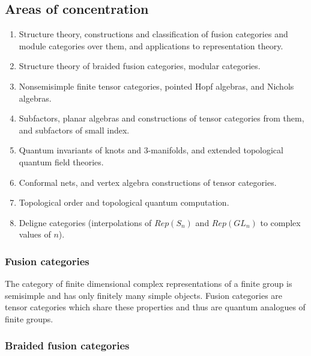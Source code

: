 \documentclass[11pt]{article}
\begin{document}



\subsection{Areas of concentration}
\begin{enumerate}
\item Structure theory, constructions and classification of fusion categories and module categories over them, and applications to representation theory.
\item Structure theory of braided fusion categories, modular categories.
\item Nonsemisimple finite tensor categories, pointed Hopf algebras, and Nichols algebras.
\item Subfactors, planar algebras and constructions of tensor categories from them, and subfactors of small index.
\item Quantum invariants of knots and 3-manifolds, and extended topological quantum field theories.
\item Conformal nets, and vertex algebra constructions of tensor categories.
\item Topological order and topological quantum computation.
\item Deligne categories (interpolations of $Rep(S_n)$ and $Rep(GL_n)$ to complex values of $n$).
\end{enumerate}

\subsubsection{Fusion categories}
The category of finite dimensional complex representations of a finite group
is semisimple and has only finitely many simple objects.  Fusion categories
are tensor categories which share these properties and thus are quantum
analogues of finite groups.



\subsubsection{Braided fusion categories}

\end{document}

